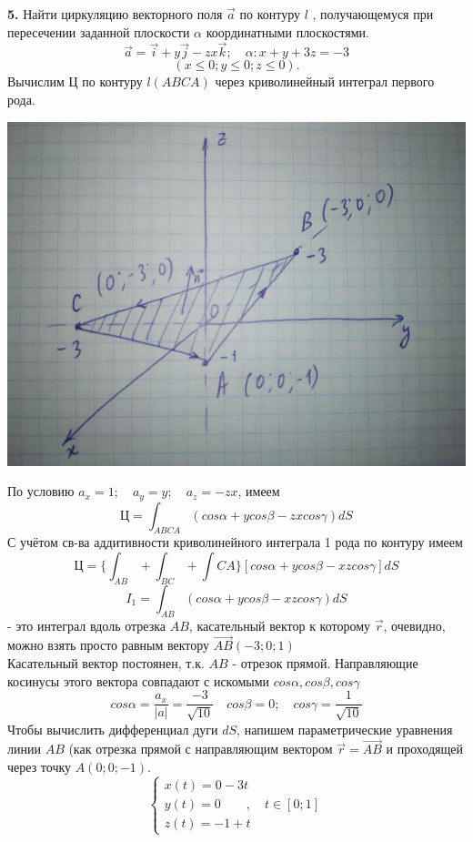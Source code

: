 \documentclass[11pt]{article}
\begin{document}
 
\pagestyle{empty}

\textbf{5.} Найти циркуляцию векторного поля $\vec{a}$ по контуру $l$ , получающемуся при пересечении заданной плоскости $\alpha$ координатными плоскостями.
\[\vec{a} = \vec{i} + y\vec{j} - zx\vec{k}; \quad \alpha: x + y + 3z = - 3\]
\[(x \leq 0; y \leq 0; z \leq 0).\]
Вычислим Ц по контуру $l (ABCA)$ через криволинейный интеграл первого рода. \\
\begin{center}
\includegraphics[scale=0.2]{5.jpg} 
\end{center}
По условию $a_x = 1; \quad a_y = y; \quad a_z = -zx$, имеем
\[\text{Ц} = \int_{ABCA}(cos\alpha + ycos\beta - zxcos\gamma)dS\]
С учётом св-ва аддитивности криволинейного интеграла 1 рода по контуру имеем \[\text{Ц} = \Big\lbrace \int_{AB} + \int_{BC} + \int{CA} \Big\rbrace [cos\alpha + y cos\beta - xzcos\gamma]dS \]
\[I_1 = \int_{AB}(cos\alpha + y cos\beta - xzcos\gamma)dS\]
- это интеграл вдоль отрезка $AB$, касательный вектор к которому $\vec{r}$, очевидно, можно взять просто равным вектору $\vec{AB} (-3; 0; 1)$\\
Касательный вектор постоянен, т.к. $AB$ - отрезок прямой. Направляющие косинусы этого вектора совпадают с искомыми $cos\alpha, cos\beta, cos\gamma$
\[cos\alpha = \frac{a_x}{|a|} = \frac{-3}{\sqrt{10}} \quad cos\beta = 0; \quad cos\gamma = \frac{1}{\sqrt{10}}\]
Чтобы вычислить дифференциал дуги $dS$, напишем параметрические уравнения линии $AB$ (как отрезка прямой с направляющим вектором $\vec{r} = \vec{AB}$ и проходящей через точку $A(0; 0; -1)$.
\[
\begin{cases}
	x(t) = 0 - 3t \\
	y(t) = 0 \quad\quad , \quad t\in [0; 1] \\
	z(t) = -1 + t
\end{cases}
\]
\end{document}
